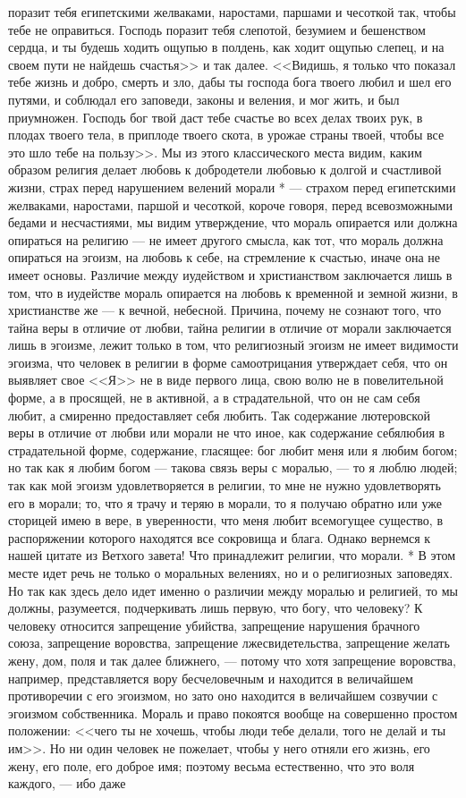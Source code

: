 \documentclass[12pt]{article}
\begin{document}
поразит тебя египетскими желваками, наростами, паршами и чесоткой так, чтобы тебе не оправиться. Господь поразит тебя слепотой, безумием и бешенством сердца, и ты будешь ходить ощупью в полдень, как ходит ощупью слепец, и на своем пути не найдешь счастья>> и так далее. <<Видишь, я только что показал тебе жизнь и добро, смерть и зло, дабы ты господа бога твоего любил и шел его путями, и соблюдал его заповеди, законы и веления, и мог жить, и был приумножен. Господь бог твой даст тебе счастье во всех делах твоих рук, в плодах твоего тела, в приплоде твоего скота, в урожае страны твоей, чтобы все это шло тебе на пользу>>. Мы из этого классического места видим, каким образом религия делает любовь к добродетели любовью к долгой и счастливой жизни, страх перед нарушением велений морали * --- страхом перед египетскими желваками, наростами, паршой и чесоткой, короче говоря, перед всевозможными бедами и несчастиями, мы видим утверждение, что мораль опирается или должна опираться на религию --- не имеет другого смысла, как тот, что мораль должна опираться на эгоизм, на любовь к себе, на стремление к счастью, иначе она не имеет основы. Различие между иудейством и христианством заключается лишь в том, что в иудействе мораль опирается на любовь к временной и земной жизни, в христианстве же --- к вечной, небесной. Причина, почему не сознают того, что тайна веры в отличие от любви, тайна религии в отличие от морали заключается лишь в эгоизме, лежит только в том, что религиозный эгоизм не имеет видимости эгоизма, что человек в религии в форме самоотрицания утверждает себя, что он выявляет свое <<Я>> не в виде первого лица, свою волю не в повелительной форме, а в просящей, не в активной, а в страдательной, что он не сам себя любит, а смиренно предоставляет себя любить. Так содержание лютеровской веры в отличие от любви или морали не что иное, как содержание себялюбия в страдательной форме, содержание, гласящее: бог любит меня или я любим богом; но так как я любим богом --- такова связь веры с моралью, --- то я люблю людей; так как мой эгоизм удовлетворяется в религии, то мне не нужно удовлетворять его в морали; то, что я трачу и теряю в морали, то я получаю обратно или уже сторицей имею в вере, в уверенности, что меня любит всемогущее существо, в распоряжении которого находятся все сокровища и блага. Однако вернемся к нашей цитате из Ветхого завета! Что принадлежит религии, что морали. * В этом месте идет речь не только о моральных велениях, но и о религиозных заповедях. Но так как здесь дело идет именно о различии между моралью и религией, то мы должны, разумеется, подчеркивать лишь первую, что богу, что человеку? К человеку относится запрещение убийства, запрещение нарушения брачного союза, запрещение воровства, запрещение лжесвидетельства, запрещение желать жену, дом, поля и так далее ближнего, --- потому что хотя запрещение воровства, например, представляется вору бесчеловечным и находится в величайшем противоречии с его эгоизмом, но зато оно находится в величайшем созвучии с эгоизмом собственника. Мораль и право покоятся вообще на совершенно простом положении: <<чего ты не хочешь, чтобы люди тебе делали, того не делай и ты им>>. Но ни один человек не пожелает, чтобы у него отняли его жизнь, его жену, его поле, его доброе имя; поэтому весьма естественно, что это воля каждого, --- ибо даже 
\end{document}

